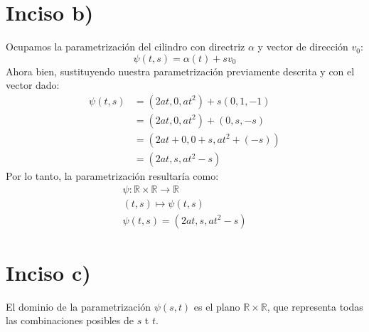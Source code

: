 \documentclass[11pt,letterpaper]{article}
\begin{document}
\section*{Inciso b)}
Ocupamos la parametrización del cilindro con directriz  $\alpha$ y vector de dirección $v_0$: 
\begin{equation*}
    \psi (t,s)=\alpha(t) + sv_0
\end{equation*}
Ahora bien, sustituyendo nuestra parametrización previamente descrita y con el vector dado: 
\begin{equation*}
    \begin{split}
        \psi(t,s) &= (2at,0,at^2) + s(0,1,-1) \\
        &= (2at, 0, at^2) + (0,s,-s) \\
        &= (2at+0, 0+s, at^2+(-s)) \\
        &= (2at, s, at^2-s)
    \end{split}
\end{equation*}
Por lo tanto, la parametrización resultaría como: 
\begin{gather*}
    \psi : \mathbb{R}\times \mathbb{R} \longrightarrow \mathbb{R}\\
    (t,s) \longmapsto \psi (t,s)\\
    \psi (t,s) = (2at,s, at^2-s)
\end{gather*}
\section*{Inciso c)}
El dominio de la parametrización $\psi(s,t)$ es el plano $\mathbb{R} \times \mathbb{R}$, que representa todas las combinaciones posibles de $s$ t $t$. \\

\end{document}
